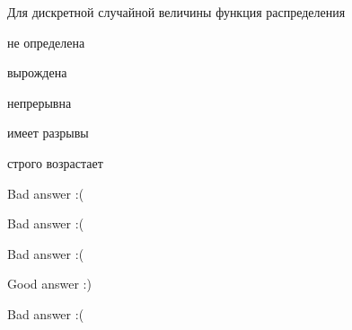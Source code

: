 
\begin{question}
Для дискретной случайной величины функция распределения
\begin{answerlist}
  \item не определена
  \item вырождена
  \item непрерывна
  \item имеет разрывы
  \item строго возрастает
\end{answerlist}
\end{question}

\begin{solution}
\begin{answerlist}
  \item Bad answer :(
  \item Bad answer :(
  \item Bad answer :(
  \item Good answer :)
  \item Bad answer :(
\end{answerlist}
\end{solution}

